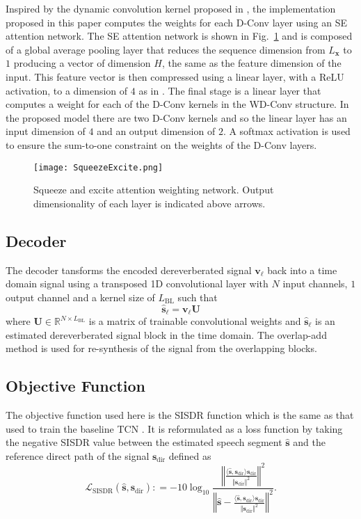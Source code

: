 \documentclass{article}
\newcommand{\vek}[1]{\ensuremath{\mathbf{#1}}}    \newcommand{\vekc}[1]{\ensuremath{\boldsymbol{\mathcal{#1}}}}
\newcommand{\Real}{\mathbb{R}}
\begin{document}
Inspired by the dynamic convolution kernel proposed in \cite{dynaconv}, the implementation proposed in this paper computes the weights for each \ac{D-Conv} layer using an \ac{SE} attention network\cite{8578843}. The \ac{SE} attention network  is shown in Fig.~\ref{fig:se_network} and is composed of a global average pooling layer that reduces the sequence dimension from $L_\vek{x}$ to $1$ producing a vector of dimension $H$, the same as the feature dimension of the input. This feature vector is then compressed using a linear layer, with a \ac{ReLU} activation, to a dimension of $4$ as in \cite{dynaconv}. The final stage is a linear layer that  computes a weight for each of the \ac{D-Conv} kernels in the \ac{WD-Conv} structure. In the proposed model there are two \ac{D-Conv} kernels and so the linear layer has an input dimension of $4$ and an output dimension of $2$. A softmax activation is used to ensure the sum-to-one constraint on the weights of the \ac{D-Conv} layers.
\begin{figure}[!t]
    \centering\large
    \texttt{[image: SqueezeExcite.png]} 
    \caption{Squeeze and excite attention weighting network. Output dimensionality of each layer is indicated above arrows.}
    \label{fig:se_network}
\end{figure}
\subsection{Decoder}
The decoder tansforms the encoded dereverberated signal $\vek{v}_{\ell}$ back into a time domain signal using a transposed 1D convolutional layer with $N$ input channels, $1$ output channel and a kernel size of $L_\mathrm{BL}$ such that
\begin{equation}
 \hat{\vek{s}}_{\ell}=\vek{v}_{\ell}\vek{U}
\end{equation}
where $\vek{U}\in\Real^{N\times L_\mathrm{BL}}$ is a matrix of trainable convolutional weights and $\hat{\vek{s}}_{\ell}$ is an estimated dereverberated signal block in the time domain. The overlap-add method is used for re-synthesis of the signal from the overlapping blocks.
\subsection{Objective Function}
The objective function used here is the \ac{SISDR} function \cite{LeRoux} which is the same as that used to train the baseline \ac{TCN} \cite{rfield}. It is reformulated as a loss function by taking the negative \ac{SISDR} value between the estimated speech segment $\hat{\vek{s}}$ and the reference direct path of the signal $\vek{s}_\mathrm{dir}$ defined as
\begin{equation} 
\label{eq:DefSISDR}
\mathcal{L}_\text{SISDR}(\hat{\vek{s}},\vek{s}_\mathrm{dir}): 
= - 10\log_{10} \frac{\left\Vert 
\frac{\langle \hat{\vek{s}},\vek{s}_\mathrm{dir}\rangle 
\vek{s}_\mathrm{dir}}{\Vert \vek{s}_\mathrm{dir}\Vert^{2}}\right\Vert^{2}}{\left\Vert\hat{\vek{s}}-\frac{\langle \hat{\vek{s}},\vek{s}_\mathrm{dir}\rangle 
\vek{s}_\mathrm{dir}}{\Vert \vek{s}_\mathrm{dir}\Vert^{2}}\right\Vert^{2}}.
\end{equation}
\end{document}
